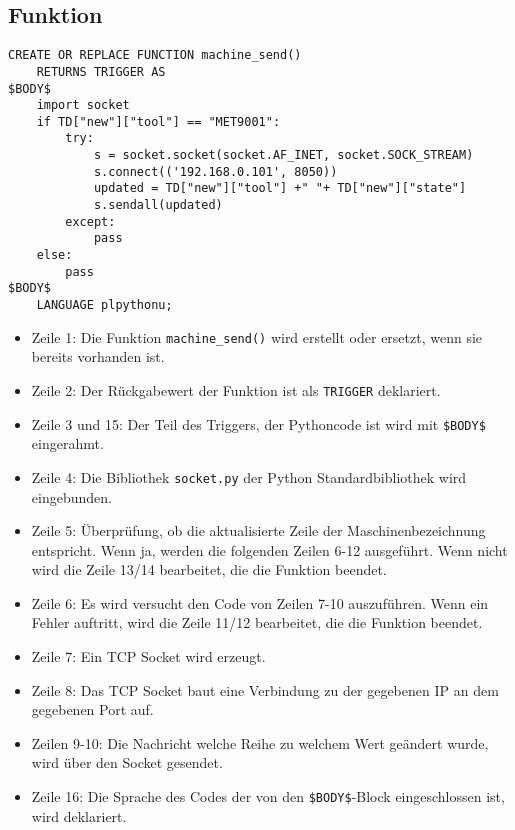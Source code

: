 \documentclass{scrartcl}
\begin{document}
\subsection{Funktion}
\begin{lstlisting}[label=trigger-func2,caption=Trigger Function]
CREATE OR REPLACE FUNCTION machine_send()  
    RETURNS TRIGGER AS
$BODY$
    import socket
    if TD["new"]["tool"] == "MET9001": 
        try:
            s = socket.socket(socket.AF_INET, socket.SOCK_STREAM)
            s.connect(('192.168.0.101', 8050)) 
            updated = TD["new"]["tool"] +" "+ TD["new"]["state"]
            s.sendall(updated)
        except:
            pass
    else:
        pass
$BODY$
    LANGUAGE plpythonu;
\end{lstlisting}

\begin{itemize}
\item Zeile 1: Die Funktion \lstinline`machine_send()` wird erstellt oder ersetzt, wenn sie bereits vorhanden ist.
\item Zeile 2: Der Rückgabewert der Funktion ist als \lstinline`TRIGGER` deklariert.
\item Zeile 3 und 15: Der Teil des Triggers, der Pythoncode ist wird mit \lstinline`$BODY$` eingerahmt.
\item Zeile 4: Die Bibliothek \lstinline`socket.py` der Python Standardbibliothek wird  eingebunden.
\item Zeile 5: Überprüfung, ob die aktualisierte Zeile der Maschinenbezeichnung entspricht. Wenn ja, werden die folgenden Zeilen 6-12 ausgeführt. Wenn nicht wird die Zeile 13/14 bearbeitet, die die Funktion beendet.
\item Zeile 6: Es wird versucht den Code von Zeilen 7-10 auszuführen. Wenn ein Fehler auftritt, wird die Zeile 11/12 bearbeitet, die die Funktion beendet.
\item Zeile 7: Ein TCP Socket wird erzeugt.
\item Zeile 8: Das TCP Socket baut eine Verbindung zu der gegebenen IP an dem gegebenen Port auf.
\item Zeilen 9-10: Die Nachricht welche Reihe zu welchem Wert geändert wurde, wird über den Socket gesendet.
\item Zeile 16: Die Sprache des Codes der von den \lstinline`$BODY$`-Block eingeschlossen ist, wird deklariert.
\end{itemize}
\end{document}
